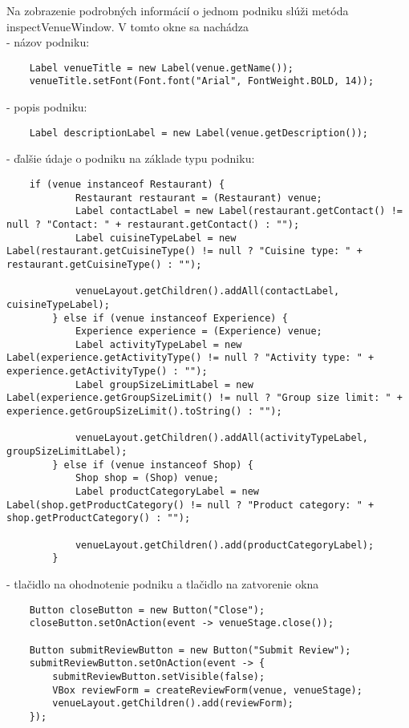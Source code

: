 \documentclass{article}
\begin{document}
Na zobrazenie podrobných informácií o jednom podniku slúži metóda inspectVenueWindow.
V tomto okne sa nachádza \\
- názov podniku:
\begin{verbatim}
    Label venueTitle = new Label(venue.getName());
    venueTitle.setFont(Font.font("Arial", FontWeight.BOLD, 14));
\end{verbatim}
- popis podniku:
\begin{verbatim}
    Label descriptionLabel = new Label(venue.getDescription());
\end{verbatim}
- ďalšie údaje o podniku na základe typu podniku:
\begin{verbatim}
    if (venue instanceof Restaurant) {
            Restaurant restaurant = (Restaurant) venue;
            Label contactLabel = new Label(restaurant.getContact() != null ? "Contact: " + restaurant.getContact() : "");
            Label cuisineTypeLabel = new Label(restaurant.getCuisineType() != null ? "Cuisine type: " + restaurant.getCuisineType() : "");

            venueLayout.getChildren().addAll(contactLabel, cuisineTypeLabel);
        } else if (venue instanceof Experience) {
            Experience experience = (Experience) venue;
            Label activityTypeLabel = new Label(experience.getActivityType() != null ? "Activity type: " + experience.getActivityType() : "");
            Label groupSizeLimitLabel = new Label(experience.getGroupSizeLimit() != null ? "Group size limit: " + experience.getGroupSizeLimit().toString() : "");

            venueLayout.getChildren().addAll(activityTypeLabel, groupSizeLimitLabel);
        } else if (venue instanceof Shop) {
            Shop shop = (Shop) venue;
            Label productCategoryLabel = new Label(shop.getProductCategory() != null ? "Product category: " + shop.getProductCategory() : "");

            venueLayout.getChildren().add(productCategoryLabel);
        }
\end{verbatim}
- tlačidlo na ohodnotenie podniku a tlačidlo na zatvorenie okna
\begin{verbatim}
    Button closeButton = new Button("Close");
    closeButton.setOnAction(event -> venueStage.close());

    Button submitReviewButton = new Button("Submit Review");
    submitReviewButton.setOnAction(event -> {
        submitReviewButton.setVisible(false);
        VBox reviewForm = createReviewForm(venue, venueStage);
        venueLayout.getChildren().add(reviewForm);
    });    
\end{verbatim}
\end{document}
